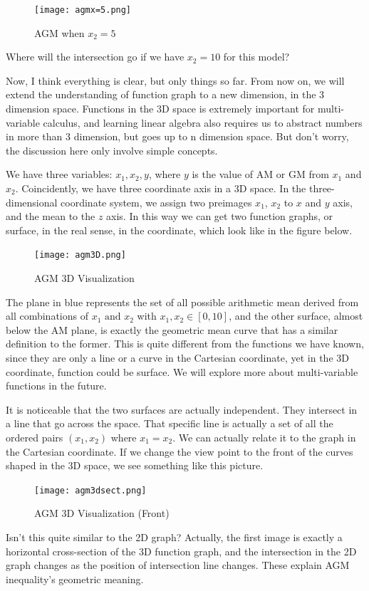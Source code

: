 \documentclass[
	12pt, %
	fleqn, %
	a4paper, %
]{LegrandOrangeBook}
\begin{document}
\begin{figure}[H]
    \centering
    \texttt{[image: agmx=5.png]}
    \caption{AGM when $x_2 = 5$}
\end{figure}

\begin{problem}
    Where will the intersection go if we have $x_2 = 10$ for this model?
\end{problem}

Now, I think everything is clear, but only things so far. From now on, we will extend the understanding of function graph to a new
dimension, in the 3 dimension space. Functions in the 3D space is extremely important for multi-variable calculus, and learning linear 
algebra also requires us to abstract numbers in more than 3 dimension, but goes up to n dimension space. But don't worry, the discussion
here only involve simple concepts. 

We have three variables: $x_1, x_2, y$, where $y$ is the value of AM or GM from $x_1$ and $x_2$. Coincidently, we have three coordinate
axis in a 3D space. In the three-dimensional coordinate system, we assign two preimages $x_1$, $x_2$ to $x$ and $y$ axis, and the mean
to the $z$ axis. In this way we can get two function graphs, or surface, in the real sense, in the coordinate, which look like in the 
figure below.
\begin{figure}[H]
    \centering
    \texttt{[image: agm3D.png]}
    \caption{AGM 3D Visualization}
\end{figure}

The plane in blue represents the set of all possible arithmetic mean derived from all combinations of $x_1 \text{ and }x_2$ with $x_1,x_2\in [0,10]$, and the other 
surface, almost below the AM plane, is exactly the geometric mean curve that has a similar definition to the former. This is quite different from the functions
we have known, since they are only a line or a curve in the Cartesian coordinate, yet in the 3D coordinate, function could be surface. We will explore more
about multi-variable functions in the future. 

It is noticeable that the two surfaces are actually independent. They intersect in a line that go across the space. That specific line is actually a set of all the
ordered pairs $(x_1,x_2)$ where $x_1 = x_2$. We can actually relate it to the graph in the Cartesian coordinate. If we change the view point to the front of the
curves shaped in the 3D space, we see something like this picture.
\begin{figure}[H]
    \centering
    \texttt{[image: agm3dsect.png]}
    \caption{AGM 3D Visualization (Front)}
\end{figure}
Isn't this quite similar to the 2D graph? Actually, the first image is exactly a horizontal cross-section of the 3D function graph, and the intersection in the 2D 
graph changes as the position of intersection line changes. These explain AGM inequality's geometric meaning.
\end{document}

